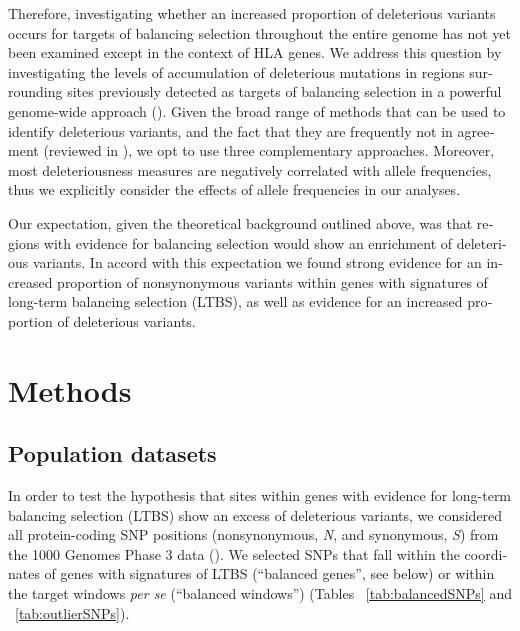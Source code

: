\begin{refsection}
\begin{otherlanguage}{english}
Therefore, investigating whether an increased proportion of deleterious variants occurs for targets of balancing selection throughout the entire genome has not yet been examined except in the context of HLA genes. We address this question by investigating the levels of accumulation of deleterious mutations in regions surrounding sites previously detected as targets of balancing selection in a powerful genome-wide approach (\cite{Bitarello2016}). Given the broad range of methods that can be used to identify deleterious variants, and the fact that they are frequently not in agreement (reviewed in \cite{Henn2015a}), we opt to use three complementary approaches. Moreover, most deleteriousness measures are negatively correlated with allele frequencies, thus we explicitly consider the effects of allele frequencies in our analyses.

Our expectation, given the theoretical background outlined above, was that regions with evidence for balancing selection would show an enrichment of deleterious variants. In accord with this expectation we found  strong evidence for an increased proportion of nonsynonymous variants within genes with signatures of long-term balancing selection (LTBS), as well as evidence for an increased proportion of deleterious variants.  

\section{Methods}

\subsection{Population datasets}

In order to test the hypothesis that sites within genes with evidence for long-term balancing selection (LTBS) show an excess of deleterious variants, we considered all protein-coding SNP positions (nonsynonymous, \emph{N}, and synonymous, \emph{S}) from the 1000 Genomes Phase 3 data (\cite{Auton2015}). We selected SNPs that fall within the  coordinates of genes with signatures of LTBS (\enquote{balanced genes}, see below) or  within the target windows \emph{per se} (\enquote{balanced windows}) (Tables ~\ref{tab:balancedSNPs} and ~\ref{tab:outlierSNPs}).


\end{otherlanguage}
\end{refsection}
